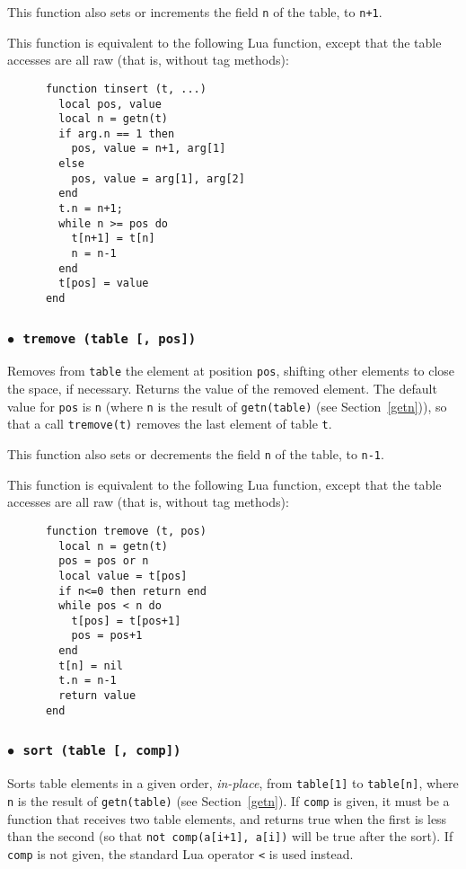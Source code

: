 \documentclass[11pt]{article}
\newcommand{\See}[1]{Section~\ref{#1}}
\newcommand{\see}[1]{(see \See{#1})}
\newcommand{\T}[1]{{\tt #1}}
\newcommand{\Deffunc}[1]{\index{#1}}
\newcommand{\ff}{$\bullet$\ }
\begin{document}
This function also sets or increments the field \verb|n| of the table,
to \verb|n+1|.

This function is equivalent to the following Lua function,
except that the table accesses are all raw (that is, without tag methods):
\begin{verbatim}
      function tinsert (t, ...)
        local pos, value
        local n = getn(t)
        if arg.n == 1 then
          pos, value = n+1, arg[1]
        else
          pos, value = arg[1], arg[2]
        end
        t.n = n+1;
        while n >= pos do
          t[n+1] = t[n]
          n = n-1
        end
        t[pos] = value
      end
\end{verbatim}

\subsubsection*{\ff \T{tremove (table [, pos])}}\Deffunc{tremove}

Removes from \verb|table| the element at position \verb|pos|,
shifting other elements to close the space, if necessary.
Returns the value of the removed element.
The default value for \verb|pos| is \verb|n|
(where \verb|n| is the result of \verb|getn(table)| \see{getn}),
so that a call \verb|tremove(t)| removes the last element
of table \verb|t|.

This function also sets or decrements the field \verb|n| of the table,
to \verb|n-1|.

This function is equivalent to the following Lua function,
except that the table accesses are all raw (that is, without tag methods):
\begin{verbatim}
      function tremove (t, pos)
        local n = getn(t)
        pos = pos or n
        local value = t[pos]
        if n<=0 then return end
        while pos < n do
          t[pos] = t[pos+1]
          pos = pos+1
        end
        t[n] = nil
        t.n = n-1
        return value
      end
\end{verbatim}

\subsubsection*{\ff \T{sort (table [, comp])}}\Deffunc{sort}
Sorts table elements in a given order, \emph{in-place},
from \verb|table[1]| to \verb|table[n]|,
where \verb|n| is the result of \verb|getn(table)| \see{getn}.
If \verb|comp| is given,
it must be a function that receives two table elements,
and returns true when the first is less than the second
(so that \verb|not comp(a[i+1], a[i])| will be true after the sort).
If \verb|comp| is not given,
the standard Lua operator \verb|<| is used instead.
\end{document}
